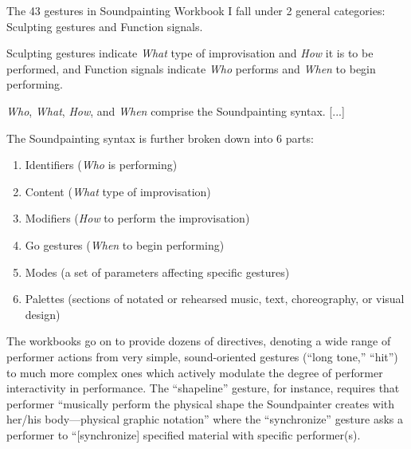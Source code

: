     \begin{smallquote}
        The 43 gestures in Soundpainting Workbook I fall under 2 general categories: Sculpting gestures and Function signals.

        \vspace{7pt}
        
        \noindent Sculpting gestures indicate \textit{What} type of improvisation and \textit{How} it is to be performed, and Function signals indicate \textit{Who} performs and \textit{When} to begin performing.

        \vspace{7pt}
    
        \noindent \textit{Who}, \textit{What}, \textit{How}, and \textit{When} comprise the Soundpainting syntax. [...] 

        \vspace{7pt}
        
        \noindent The Soundpainting syntax is further broken down into 6 parts:
            \begin{enumerate}
                \item Identifiers (\textit{Who} is performing)
                \item Content (\textit{What} type of improvisation)
                \item Modifiers (\textit{How} to perform the improvisation)
                \item Go gestures (\textit{When} to begin performing)
                \item Modes (a set of parameters affecting specific gestures)
                \item Palettes (sections of notated or rehearsed music, text, choreography, or visual design)\autocite[4]{Thompson_2006_1}
            \end{enumerate}
    \end{smallquote}

    The workbooks go on to provide dozens of directives, denoting a wide range of performer actions from very simple, sound-oriented gestures (``long tone,'' ``hit'') to much more complex ones which actively modulate the degree of performer interactivity in performance. The ``shapeline'' gesture, for instance, requires that performer ``musically perform the physical shape the Soundpainter creates with her/his body---physical graphic notation'' where the ``synchronize'' gesture asks a performer to ``[synchronize] specified material with specific performer(s).\autocite[34-5]{Thompson_2006_1}
    
